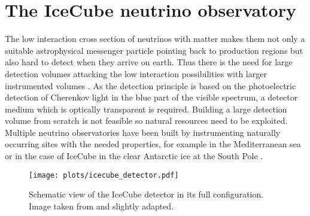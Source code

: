 \chapter{The IceCube neutrino observatory}
  \label{chap:icecube}

The low interaction cross section of neutrinos with matter makes them not only a suitable astrophysical messenger particle pointing back to production regions but also hard to detect when they arrive on earth.
Thus there is the need for large detection volumes attacking the low interaction possibilities with larger instrumented volumes \cite{Katz:2011ke}.
As the detection principle is based on the photoelectric detection of Cherenkov light in the blue part of the visible spectrum, a detector medium which is optically transparent is required.
Building a large detection volume from scratch is not feasible so natural resources need to be exploited.
Multiple neutrino observatories have been built by instrumenting naturally occurring sites with the needed properties, for example in the Mediterranean sea or in the case of IceCube in the clear Antarctic ice at the South Pole \cite{Katz:2011ke}.

\begin{figure}[htbp]
  \centering
  \texttt{[image: plots/icecube\_detector.pdf]}
  \caption[Schematic view of the IceCube detector]{
    Schematic view of the IceCube detector in its full configuration.
    Image taken from \cite{ICOnlineGalleryDetector} and slightly adapted.
  }
  \label{fig:icecube_detector}
\end{figure}


